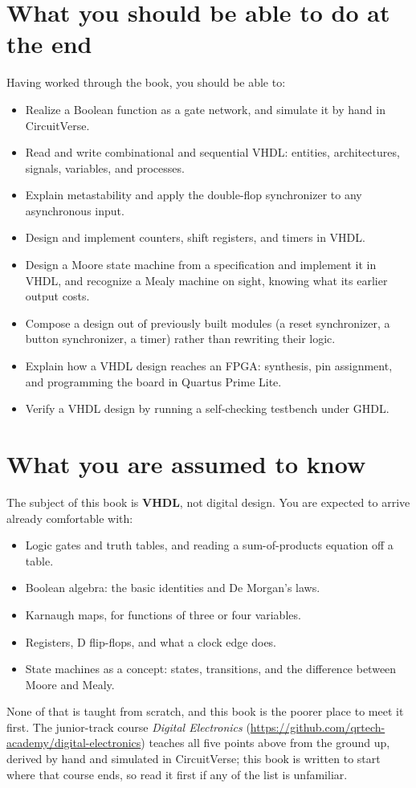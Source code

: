 \section*{What you should be able to do at the end}
Having worked through the book, you should be able to:
\begin{itemize}
  \item Realize a Boolean function as a gate network, and simulate it by hand in CircuitVerse.
  \item Read and write combinational and sequential VHDL: entities, architectures, signals,
    variables, and processes.
  \item Explain metastability and apply the double-flop synchronizer to any asynchronous input.
  \item Design and implement counters, shift registers, and timers in VHDL.
  \item Design a Moore state machine from a specification and implement it in VHDL, and recognize a
    Mealy machine on sight, knowing what its earlier output costs.
  \item Compose a design out of previously built modules (a reset synchronizer, a button
    synchronizer, a timer) rather than rewriting their logic.
  \item Explain how a VHDL design reaches an FPGA: synthesis, pin assignment, and programming the
    board in Quartus Prime Lite.
  \item Verify a VHDL design by running a self-checking testbench under GHDL.
\end{itemize}

\section*{What you are assumed to know}
The subject of this book is \textbf{VHDL}, not digital design. You are expected to arrive already
comfortable with:
\begin{itemize}
  \item Logic gates and truth tables, and reading a sum-of-products equation off a table.
  \item Boolean algebra: the basic identities and De Morgan's laws.
  \item Karnaugh maps, for functions of three or four variables.
  \item Registers, D flip-flops, and what a clock edge does.
  \item State machines as a concept: states, transitions, and the difference between Moore and
    Mealy.
\end{itemize}
None of that is taught from scratch, and this book is the poorer place to meet it first. The
junior-track course \emph{Digital Electronics}
(\url{https://github.com/qrtech-academy/digital-electronics}) teaches all five points above from the
ground up, derived by hand and simulated in CircuitVerse; this book is written to start where that
course ends, so read it first if any of the list is unfamiliar.

